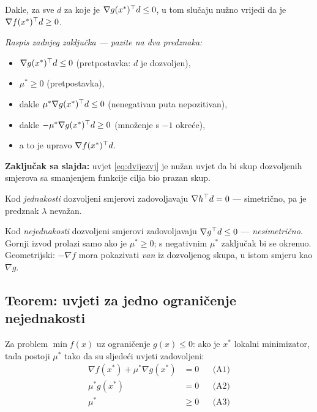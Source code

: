 Dakle, za sve $d$ za koje je $\nabla g(x^{*})^{\top} d \le 0$, u tom slučaju nužno
vrijedi da je $\nabla f(x^{*})^{\top} d \ge 0$.

\emph{Raspis zadnjeg zaključka --- pazite na dva predznaka:}
\begin{itemize}
  \item $\nabla g(x^{*})^{\top} d \le 0$ (pretpostavka: $d$ je dozvoljen),
  \item $\mu^{*} \ge 0$ (pretpostavka),
  \item dakle $\mu^{*}\nabla g(x^{*})^{\top} d \le 0$ (nenegativan puta nepozitivan),
  \item dakle $-\mu^{*}\nabla g(x^{*})^{\top} d \ge 0$ (množenje s $-1$ okreće),
  \item a to je upravo $\nabla f(x^{*})^{\top} d$. \checkmark
\end{itemize}

\textbf{Zaključak sa slajda:} uvjet \eqref{eq:dvijezvj} je nužan uvjet da bi
skup dozvoljenih smjerova sa smanjenjem funkcije cilja bio prazan skup.

\begin{napomena}
Kod \emph{jednakosti} dozvoljeni smjerovi zadovoljavaju $\nabla h^{\top} d = 0$ ---
simetrično, pa je predznak $\lambda$ nevažan.

Kod \emph{nejednakosti} dozvoljeni smjerovi zadovoljavaju $\nabla g^{\top} d \le 0$
--- \emph{nesimetrično}. Gornji izvod prolazi samo ako je $\mu^{*} \ge 0$; s
negativnim $\mu^{*}$ zaključak bi se okrenuo. Geometrijski: $-\nabla f$ mora
pokazivati \emph{van} iz dozvoljenog skupa, u istom smjeru kao $\nabla g$.
\end{napomena}

\subsection{Teorem: uvjeti za jedno ograničenje nejednakosti}

\begin{teorem}
Za problem $\min f(x)$ uz ograničenje $g(x) \le 0$: ako je $x^{*}$ lokalni
minimizator, tada postoji $\mu^{*}$ tako da su sljedeći uvjeti zadovoljeni:
\begin{align}
\nabla f(x^{*}) + \mu^{*}\nabla g(x^{*}) &= 0 &&\text{(A1)} \\
\mu^{*}g(x^{*}) &= 0 &&\text{(A2)} \\
\mu^{*} &\ge 0 &&\text{(A3)}
\end{align}
\end{teorem}

